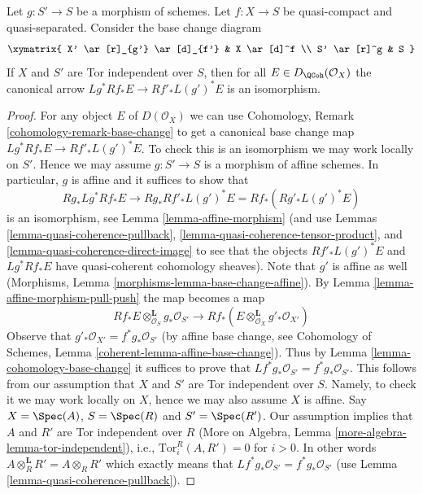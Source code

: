 \begin{lemma}
\label{lemma-compare-base-change}
Let $g : S' \to S$ be a morphism of schemes.
Let $f : X \to S$ be quasi-compact and quasi-separated.
Consider the base change diagram
$$
\xymatrix{
X' \ar[r]_{g'} \ar[d]_{f'} &
X \ar[d]^f \\
S' \ar[r]^g &
S
}
$$
If $X$ and $S'$ are Tor independent over $S$, then for all
$E \in D_\QCoh(\mathcal{O}_X)$ the canonical arrow
$Lg^*Rf_*E \to Rf'_*L(g')^*E$ is an isomorphism.
\end{lemma}

\begin{proof}
For any object $E$ of $D(\mathcal{O}_X)$ we can use
Cohomology, Remark \ref{cohomology-remark-base-change} to get a
canonical base change map $Lg^*Rf_*E \to Rf'_*L(g')^*E$. To check this
is an isomorphism we may work locally on $S'$. Hence we may assume
$g : S' \to S$ is a morphism of affine schemes. In particular, $g$
is affine and it suffices to show that
$$
Rg_*Lg^*Rf_*E \to Rg_*Rf'_*L(g')^*E = Rf_*(Rg'_* L(g')^* E)
$$
is an isomorphism, see Lemma \ref{lemma-affine-morphism}
(and use Lemmas \ref{lemma-quasi-coherence-pullback},
\ref{lemma-quasi-coherence-tensor-product}, and
\ref{lemma-quasi-coherence-direct-image}
to see that the objects $Rf'_*L(g')^*E$ and $Lg^*Rf_*E$
have quasi-coherent cohomology sheaves). Note that $g'$ is
affine as well (Morphisms, Lemma \ref{morphisms-lemma-base-change-affine}).
By Lemma \ref{lemma-affine-morphism-pull-push} the map becomes a map
$$
Rf_*E \otimes_{\mathcal{O}_S}^\mathbf{L} g_*\mathcal{O}_{S'}
\longrightarrow
Rf_*(E \otimes_{\mathcal{O}_X}^\mathbf{L} g'_*\mathcal{O}_{X'})
$$
Observe that $g'_*\mathcal{O}_{X'} = f^*g_*\mathcal{O}_{S'}$ (by affine
base change, see Cohomology of Schemes, Lemma
\ref{coherent-lemma-affine-base-change}).
Thus by
Lemma \ref{lemma-cohomology-base-change} it suffices to prove that
$Lf^*g_*\mathcal{O}_{S'} = f^*g_*\mathcal{O}_{S'}$. This follows from our
assumption that $X$ and $S'$ are Tor independent over $S$. Namely, to
check it we may work locally on $X$, hence we may also assume $X$ is affine.
Say $X = \Spec(A)$, $S = \Spec(R)$ and $S' = \Spec(R')$. Our assumption
implies that $A$ and $R'$ are Tor independent over $R$
(More on Algebra, Lemma \ref{more-algebra-lemma-tor-independent}), i.e.,
$\text{Tor}_i^R(A, R') = 0$ for $i > 0$. In other words
$A \otimes_R^\mathbf{L} R' = A \otimes_R R'$ which exactly means
that $Lf^*g_*\mathcal{O}_{S'} = f^*g_*\mathcal{O}_{S'}$
(use Lemma \ref{lemma-quasi-coherence-pullback}).
\end{proof}

